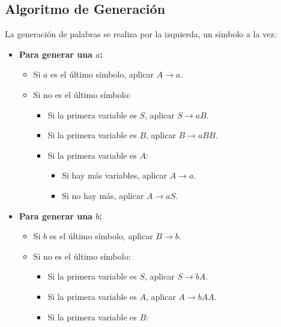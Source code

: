 \documentclass[12pt]{report} %
\providecommand{\tightlist}{%
  \setlength{\itemsep}{0pt}\setlength{\parskip}{0pt}}
\begin{document}
\hypertarget{algoritmo-de-generaciuxf3n}{%
\subsection{Algoritmo de Generación}\label{algoritmo-de-generaciuxf3n}}

La generación de palabras se realiza por la izquierda, un símbolo a la
vez:

\begin{itemize}
\tightlist
\item
  \textbf{Para generar una \(a\):}

  \begin{itemize}
  \tightlist
  \item
    Si \(a\) es el último símbolo, aplicar \(A \to a\).\\
  \item
    Si no es el último símbolo:

    \begin{itemize}
    \tightlist
    \item
      Si la primera variable es \(S\), aplicar \(S \to aB\).\\
    \item
      Si la primera variable es \(B\), aplicar \(B \to aBB\).\\
    \item
      Si la primera variable es \(A\):

      \begin{itemize}
      \tightlist
      \item
        Si hay más variables, aplicar \(A \to a\).\\
      \item
        Si no hay más, aplicar \(A \to aS\).
      \end{itemize}
    \end{itemize}
  \end{itemize}
\item
  \textbf{Para generar una \(b\):}

  \begin{itemize}
  \tightlist
  \item
    Si \(b\) es el último símbolo, aplicar \(B \to b\).\\
  \item
    Si no es el último símbolo:

    \begin{itemize}
    \tightlist
    \item
      Si la primera variable es \(S\), aplicar \(S \to bA\).\\
    \item
      Si la primera variable es \(A\), aplicar \(A \to bAA\).\\
    \item
      Si la primera variable es \(B\):


\end{itemize}
\end{itemize}
\end{itemize}
\end{document}
